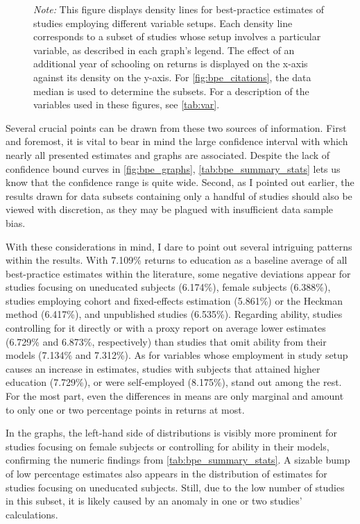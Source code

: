 \begin{figure}[!htbp]
\begin{center}
\end{center}\vspace{-0.6cm}
\captionsetup{width=0.78\textwidth, font = scriptsize}
\caption*{\emph{Note:} This figure displays density lines for best-practice estimates of studies employing different variable setups. Each density line corresponds to a subset of studies whose setup involves a particular variable, as described in each graph's legend. The effect of an additional year of schooling on returns is displayed on the x-axis against its density on the y-axis. For \autoref{fig:bpe_citations}, the data median is used to determine the subsets. For a description of the variables used in these figures, see \autoref{tab:var}.}
\end{figure}

Several crucial points can be drawn from these two sources of information. First and foremost, it is vital to bear in mind the large confidence interval with which nearly all presented estimates and graphs are associated. Despite the lack of confidence bound curves in \autoref{fig:bpe_graphs}, \autoref{tab:bpe_summary_stats} lets us know that the confidence range is quite wide. Second, as I pointed out earlier, the results drawn for data subsets containing only a handful of studies should also be viewed with discretion, as they may be plagued with insufficient data sample bias. 

With these considerations in mind, I dare to point out several intriguing patterns within the results. With 7.109\% returns to education as a baseline average of all best-practice estimates within the literature, some negative deviations appear for studies focusing on uneducated subjects (6.174\%), female subjects (6.388\%), studies employing cohort and fixed-effects estimation (5.861\%) or the Heckman method (6.417\%), and unpublished studies (6.535\%). Regarding ability, studies controlling for it directly or with a proxy report on average lower estimates (6.729\% and 6.873\%, respectively) than studies that omit ability from their models (7.134\% and 7.312\%). As for variables whose employment in study setup causes an increase in estimates, studies with subjects that attained higher education (7.729\%), or were self-employed (8.175\%), stand out among the rest. For the most part, even the differences in means are only marginal and amount to only one or two percentage points in returns at most.

In the graphs, the left-hand side of distributions is visibly more prominent for studies focusing on female subjects or controlling for ability in their models, confirming the numeric findings from \autoref{tab:bpe_summary_stats}. A sizable bump of low percentage estimates also appears in the distribution of estimates for studies focusing on uneducated subjects. Still, due to the low number of studies in this subset, it is likely caused by an anomaly in one or two studies' calculations.

